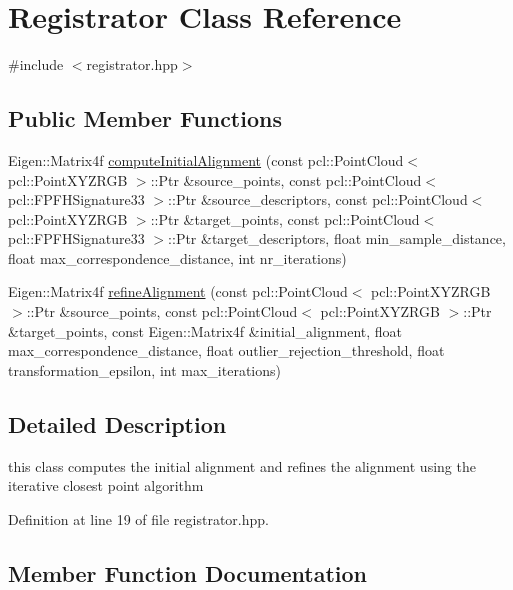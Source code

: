 \hypertarget{class_registrator}{}\section{Registrator Class Reference}
\label{class_registrator}


{\ttfamily \#include $<$registrator.\+hpp$>$}

\subsection*{Public Member Functions}
\begin{DoxyCompactItemize}
\item 
Eigen\+::\+Matrix4f \hyperlink{class_registrator_a0430c7ceee244327e61b4c71c0b7c0bd}{compute\+Initial\+Alignment} (const pcl\+::\+Point\+Cloud$<$ pcl\+::\+Point\+X\+Y\+Z\+R\+GB $>$\+::Ptr \&source\+\_\+points, const pcl\+::\+Point\+Cloud$<$ pcl\+::\+F\+P\+F\+H\+Signature33 $>$\+::Ptr \&source\+\_\+descriptors, const pcl\+::\+Point\+Cloud$<$ pcl\+::\+Point\+X\+Y\+Z\+R\+GB $>$\+::Ptr \&target\+\_\+points, const pcl\+::\+Point\+Cloud$<$ pcl\+::\+F\+P\+F\+H\+Signature33 $>$\+::Ptr \&target\+\_\+descriptors, float min\+\_\+sample\+\_\+distance, float max\+\_\+correspondence\+\_\+distance, int nr\+\_\+iterations)
\item 
Eigen\+::\+Matrix4f \hyperlink{class_registrator_af9074af8efbd597162ccfa45b8970656}{refine\+Alignment} (const pcl\+::\+Point\+Cloud$<$ pcl\+::\+Point\+X\+Y\+Z\+R\+GB $>$\+::Ptr \&source\+\_\+points, const pcl\+::\+Point\+Cloud$<$ pcl\+::\+Point\+X\+Y\+Z\+R\+GB $>$\+::Ptr \&target\+\_\+points, const Eigen\+::\+Matrix4f \&initial\+\_\+alignment, float max\+\_\+correspondence\+\_\+distance, float outlier\+\_\+rejection\+\_\+threshold, float transformation\+\_\+epsilon, int max\+\_\+iterations)
\end{DoxyCompactItemize}


\subsection{Detailed Description}
this class computes the initial alignment and refines the alignment using the iterative closest point algorithm 

Definition at line 19 of file registrator.\+hpp.



\subsection{Member Function Documentation}
\hypertarget{class_registrator_a0430c7ceee244327e61b4c71c0b7c0bd}{}\label{class_registrator_a0430c7ceee244327e61b4c71c0b7c0bd} 
